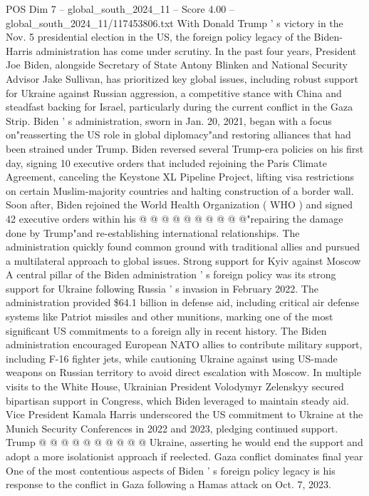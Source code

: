 \begin{textsample}{POS Dim 7 – global\_south\_2024\_11 – Score 4.00 – global\_south\_2024\_11/117453806.txt}  \label{ex:f7_pos_011}
With Donald Trump ' s victory in the Nov. 5 presidential election in the US, the foreign policy legacy of the Biden-Harris administration has come under scrutiny.
In the past four years, President Joe Biden, alongside Secretary of State Antony Blinken and National Security Advisor Jake Sullivan, has prioritized key global issues, including robust support for Ukraine against Russian aggression, a competitive stance with China and steadfast backing for Israel, particularly during the current conflict in the Gaza Strip.
Biden ' s administration, sworn in Jan. 20, 2021, began with a focus on"reasserting the US role in global diplomacy"and restoring alliances that had been strained under Trump.
Biden reversed several Trump-era policies on his first day, signing 10 executive orders that included rejoining the Paris Climate Agreement, canceling the Keystone XL Pipeline Project, lifting visa restrictions on certain Muslim-majority countries and halting construction of a border wall.
Soon after, Biden rejoined the World Health Organization ( WHO ) and signed 42 executive orders within his @ @ @ @ @ @ @ @ @ @"repairing the damage done by Trump"and re-establishing international relationships.
The administration quickly found common ground with traditional allies and pursued a multilateral approach to global issues.
Strong support for Kyiv against Moscow A central pillar of the Biden administration ' s foreign policy was its strong support for Ukraine following Russia ' s invasion in February 2022.
The administration provided \$64.1 billion in defense aid, including critical air defense systems like Patriot missiles and other munitions, marking one of the most significant US commitments to a foreign ally in recent history.
The Biden administration encouraged European NATO allies to contribute military support, including F-16 fighter jets, while cautioning Ukraine against using US-made weapons on Russian territory to avoid direct escalation with Moscow.
In multiple visits to the White House, Ukrainian President Volodymyr Zelenskyy secured bipartisan support in Congress, which Biden leveraged to maintain steady aid.
Vice President Kamala Harris underscored the US commitment to Ukraine at the Munich Security Conferences in 2022 and 2023, pledging continued support.
Trump @ @ @ @ @ @ @ @ @ @ Ukraine, asserting he would end the support and adopt a more isolationist approach if reelected.
Gaza conflict dominates final year One of the most contentious aspects of Biden ' s foreign policy legacy is his response to the conflict in Gaza following a Hamas attack on Oct. 7, 2023.

\end{textsample}
